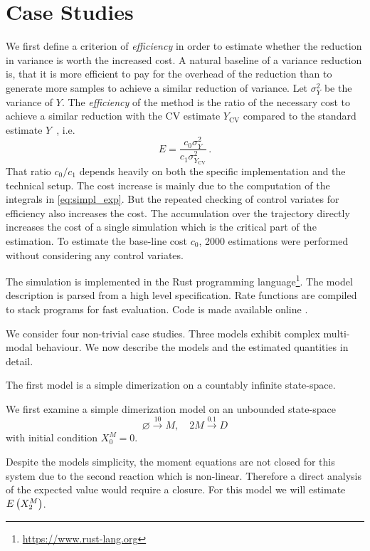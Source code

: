 \section{Case Studies}\label{sec:cv:study}
We first define a criterion of \emph{efficiency} in order to estimate
whether the reduction in variance is worth the increased cost.
A natural baseline of a variance reduction is, that it is more efficient to pay for
the overhead of the reduction than to generate more samples to achieve a similar
reduction of variance.
Let $\sigma_Y^2$ be the variance of $Y$.
The \emph{efficiency} of the method is the ratio of the necessary
cost to achieve a similar reduction with the \ac{CV} estimate $Y_{\text{CV}}$ compared to
the standard estimate $Y$~\cite{l1994efficiency}, i.e.
\begin{equation}\label{eq:efficiency}
E=\frac{c_0\sigma_Y^2}{c_1\sigma^2_{Y_{\text{CV}}}}\,.
\end{equation}
That ratio $c_0/c_1$ depends heavily on both the specific implementation and the technical setup.
The cost increase is  mainly due to the computation of the integrals in \eqref{eq:simpl_exp}.
But the repeated checking of control  variates for efficiency also increases the cost.
The accumulation over the trajectory directly increases the cost of a single simulation
which is the critical part of the estimation.
To estimate the base-line cost $c_0$, 2000 estimations were performed without
considering any control variates.

The simulation is implemented in the Rust programming language\footnote{\url{https://www.rust-lang.org}}.
The model description is parsed from a high level specification. 
Rate functions are compiled to stack programs for fast evaluation.
Code is made available online \cite{cme-simulation-github}.

We consider four non-trivial case studies. Three models exhibit complex multi-modal behaviour.
We now describe the models and the estimated quantities in detail.

The first model is a simple dimerization on a countably infinite state-space.
\begin{model*}[Dimerization]
We first examine a simple dimerization model on an unbounded state-space
$$\varnothing\xrightarrow{10}M,\quad 2M\xrightarrow{0.1}D$$
with initial condition $X_0^M=0$.
\end{model*}
Despite the models simplicity, the moment equations are not closed for this system
due to the second reaction which is non-linear.
Therefore a direct analysis of the expected value would require a closure.
For this model we will estimate ${E}\left(X^M_2\right)$.

